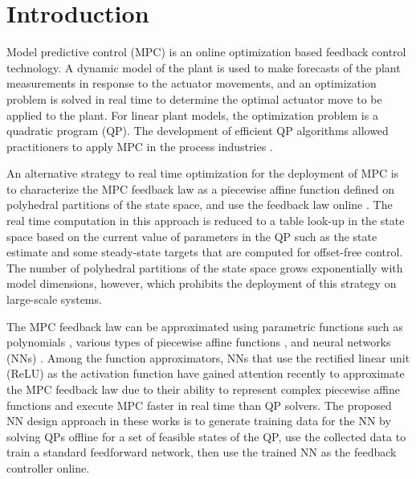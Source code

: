 \documentclass[preprint,5p, twocolumn, authoryear]{elsarticle}
\begin{document}
\section{Introduction} \label{sec:introduction}

Model predictive control (MPC) is an online optimization based feedback control
technology. A dynamic model of the plant is used to make forecasts of the plant
measurements in response to the actuator movements, and an optimization problem
is solved in real time to determine the optimal actuator move to be applied to
the plant. For linear plant models, the optimization problem is a quadratic
program (QP). The development of efficient QP algorithms
\citep*{kouzoupis:frison:zanelli:diehl:2018, wright:2019} allowed practitioners
to apply MPC in the process industries \citep*{qin:badgwell:2003, lahiri:2017}.

An alternative strategy to real time optimization for the deployment of MPC is
to characterize the MPC feedback law as a piecewise affine function defined on
polyhedral partitions of the state space, and use the feedback law online
\citep*{bemporad:morari:dua:pistikopoulos:2002, seron:goodwin:dedona:2003}. The
real time computation in this approach is reduced to a table look-up in the
state space based on the current value of parameters in the QP such as the state
estimate and some steady-state targets that are computed for offset-free
control. The number of polyhedral partitions of the state space grows
exponentially with model dimensions, however, which prohibits the deployment of
this strategy on large-scale systems.

The MPC feedback law can be approximated using parametric functions such as
polynomials \citep*{kvasnica:lofberg:fikar:2011}, various types of piecewise
affine functions \citep*{bemporad:oliveri:poggi:storace:2011,
wen:ma:ydstie:2009}, and neural networks (NNs)
\citep*{cavagnari:magni:scattolini:1999}. Among the function approximators, NNs
that use the rectified linear unit (ReLU) as the activation function have gained
attention recently \citep*{chen:saulnier:atanasov:lee:kumar:pappas:morari:2018,
karg:lucia:2020, paulson:mesbah:2020, lovelett:dietrich:lee:kevrekidis:2020} to
approximate the MPC feedback law due to their ability to represent complex
piecewise affine functions \citep*{montufar:pascanu:cho:bengio:2014} and execute
MPC faster in real time than QP solvers. The proposed NN design approach in
these works is to generate training data for the NN by solving QPs offline for a
set of feasible states of the QP, use the collected data to train a standard
feedforward network, then use the trained NN as the feedback controller online.
\end{document}

